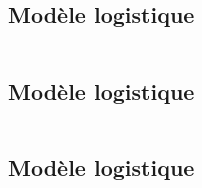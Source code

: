 \documentclass{article}
\begin{document}
\begin{verbatim}
\end{verbatim}

\subsection{Modèle logistique}

\begin{verbatim}
\end{verbatim}

\subsection{Modèle logistique}

\begin{verbatim}
\end{verbatim}

\subsection{Modèle logistique}

\begin{verbatim}
\end{verbatim}
\end{document}
